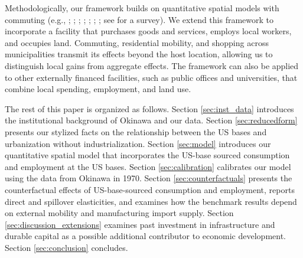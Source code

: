 \documentclass[12pt, unicode, a4paper]{article}
\newcommand{\1}{\mbox{1}\hspace{-0.25em}\mbox{l}} %
\begin{document}
Methodologically, our framework builds on quantitative spatial models with commuting (e.g., \citealt{ahlfeldt2015economics}; \citealt{monte2018commuting}; \citealt{heblich2020making}; \citealt{miyauchi2022economics}; \citealt{dingel2023spatial}; \citealt{tsivanidis2019evaluating}; \citealt{takeda2024economic}; see \citealt{redding2024survey} for a survey). We extend this framework to incorporate a facility that purchases goods and services, employs local workers, and occupies land. Commuting, residential mobility, and shopping across municipalities transmit its effects beyond the host location, allowing us to distinguish local gains from aggregate effects. The framework can also be applied to other externally financed facilities, such as public offices and universities, that combine local spending, employment, and land use.

The rest of this paper is organized as follows. Section \ref{sec:inst_data} introduces the institutional background of Okinawa and our data. Section \ref{sec:reducedform} presents our stylized facts on the relationship between the US bases and urbanization without industrialization. Section \ref{sec:model} introduces our quantitative spatial model that incorporates the US-base sourced consumption and employment at the US bases. Section \ref{sec:calibration} calibrates our model using the data from Okinawa in 1970. Section \ref{sec:counterfactuals} presents the counterfactual effects of US-base-sourced consumption and employment, reports direct and spillover elasticities, and examines how the benchmark results depend on external mobility and manufacturing import supply. Section \ref{sec:discussion_extensions} examines past investment in infrastructure and durable capital as a possible additional contributor to economic development. Section \ref{sec:conclusion} concludes.
\end{document}
